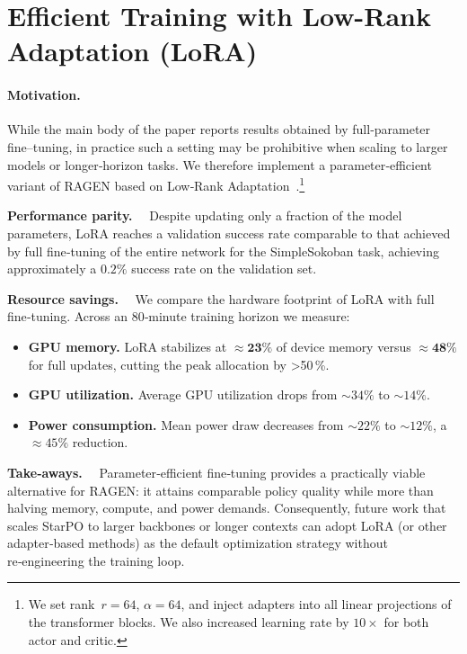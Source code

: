 \section{Efficient Training with Low-Rank Adaptation (LoRA)}
\paragraph{Motivation.}
While the main body of the paper reports results obtained by full‑parameter fine–tuning, in practice such a setting may be prohibitive when scaling to larger models or longer‐horizon tasks.  We therefore implement a parameter‑efficient variant of RAGEN based on Low‑Rank Adaptation~\citep{hu2021lora}.\footnote{We set rank~$r{=}64$, $\alpha{=}64$, and inject adapters into all linear projections of the transformer blocks. We also increased learning rate by $10\times$ for both actor and critic.}

\noindent\textbf{Performance parity.}~~
Despite updating only a fraction of the model parameters, LoRA reaches a validation success rate comparable to that achieved by full fine‑tuning of the entire network for the SimpleSokoban task, achieving approximately a $0.2\%$ success rate on the validation set.

\noindent\textbf{Resource savings.}~~
We compare the hardware footprint of LoRA with full fine‑tuning.  Across an 80‑minute training horizon we measure:

\begin{itemize}[nosep,leftmargin=*]
    \item \textbf{GPU memory.}  LoRA stabilizes at $\mathbf{\approx 23\%}$ of device memory versus $\mathbf{\approx 48\%}$ for full updates, cutting the peak allocation by \textgreater50\,\%.
    \item \textbf{GPU utilization.}  Average GPU utilization drops from \(\sim\!34\%\) to \(\sim\!14\%\).
    \item \textbf{Power consumption.}  Mean power draw decreases from \(\sim\!22\%\) to \(\sim\!12\%\), a \(\approx45\%\) reduction.
\end{itemize}


\noindent\textbf{Take‑aways.}~~
Parameter‑efficient fine‑tuning provides a practically viable alternative for RAGEN: it attains comparable policy quality while more than halving memory, compute, and power demands.  Consequently, future work that scales StarPO to larger backbones or longer contexts can adopt LoRA (or other adapter‑based methods) as the default optimization strategy without re‑engineering the training loop.

